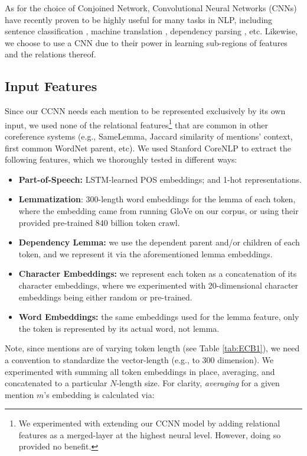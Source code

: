 \documentclass[11pt,a4paper]{article}
\begin{document}
As for the choice of Conjoined Network, Convolutional Neural Networks (CNNs) have recently proven to be highly useful for many tasks in NLP, including sentence classification \cite{DBLP:conf/emnlp/Kim14}, machine translation \cite{DBLP:conf/acl/GehringAGD17}, dependency parsing \cite{DBLP:journals/corr/YuV17}, etc.  Likewise, we choose to use a CNN due to their power in learning sub-regions of features and the relations thereof.

\subsection{Input Features}
\label{sec:features}
Since our CCNN needs each mention to be represented exclusively by its own input, we used none of the relational features\footnote{We experimented with extending our CCNN model by adding relational features as a merged-layer at the highest neural level.  However, doing so provided no benefit.} that are common in other coreference systems (e.g., SameLemma, Jaccard similarity of mentions' context, first common WordNet parent, etc).  We used Stanford CoreNLP \cite{manning-EtAl:2014:P14-5} to extract the following features, which we thoroughly tested in different ways:
\begin{itemize}
  \item \textbf{Part-of-Speech:} LSTM-learned POS embeddings; and 1-hot representations.
  \item \textbf{Lemmatization}: 300-length word embeddings for the lemma of each token, where the embedding came from running GloVe \cite{pennington2014glove} on our corpus, or using their provided pre-trained 840 billion token crawl.
  \item \textbf{Dependency Lemma:} we use the dependent parent and/or children of each token, and we represent it via the aforementioned lemma embeddings.
  \item \textbf{Character Embeddings:} we represent each token as a concatenation of its character embeddings, where we experimented with 20-dimensional character embeddings being either random or pre-trained.
  \item \textbf{Word Embeddings:} the same embeddings used for the lemma feature, only the token is represented by its actual word, not lemma.
\end{itemize}
Note, since mentions are of varying token length (see Table \ref{tab:ECB1}), we need a convention to standardize the vector-length (e.g., to 300 dimension).  We experimented with summing all token embeddings in place, averaging, and concatenated to a particular $N$-length size.  For clarity, \textit{averaging} for a given mention $m$'s embedding is calculated via:
\end{document}
